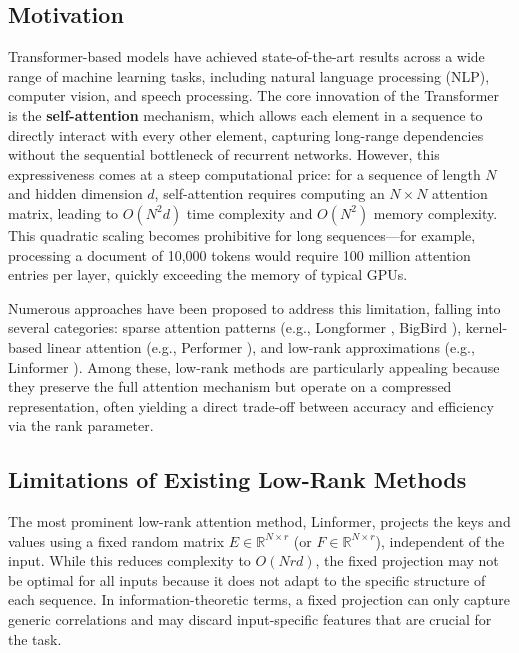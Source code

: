 \documentclass[twocolumn]{article}
\begin{document}
\subsection{Motivation}
Transformer-based models \cite{vaswani2017attention} have achieved state-of-the-art results across a wide range of machine learning tasks, including natural language processing (NLP), computer vision, and speech processing. The core innovation of the Transformer is the \textbf{self-attention} mechanism, which allows each element in a sequence to directly interact with every other element, capturing long-range dependencies without the sequential bottleneck of recurrent networks. However, this expressiveness comes at a steep computational price: for a sequence of length $N$ and hidden dimension $d$, self-attention requires computing an $N \times N$ attention matrix, leading to $O(N^2 d)$ time complexity and $O(N^2)$ memory complexity. This quadratic scaling becomes prohibitive for long sequences—for example, processing a document of 10,000 tokens would require 100 million attention entries per layer, quickly exceeding the memory of typical GPUs.

Numerous approaches have been proposed to address this limitation, falling into several categories: sparse attention patterns (e.g., Longformer \cite{beltagy2020longformer}, BigBird \cite{zaheer2020bigbird}), kernel-based linear attention (e.g., Performer \cite{choromanski2020rethinking}), and low-rank approximations (e.g., Linformer \cite{wang2020linformer}). Among these, low-rank methods are particularly appealing because they preserve the full attention mechanism but operate on a compressed representation, often yielding a direct trade-off between accuracy and efficiency via the rank parameter.

\subsection{Limitations of Existing Low-Rank Methods}
The most prominent low-rank attention method, Linformer, projects the keys and values using a fixed random matrix $E \in \mathbb{R}^{N \times r}$ (or $F \in \mathbb{R}^{N \times r}$), independent of the input. While this reduces complexity to $O(N r d)$, the fixed projection may not be optimal for all inputs because it does not adapt to the specific structure of each sequence. In information-theoretic terms, a fixed projection can only capture generic correlations and may discard input-specific features that are crucial for the task.
\end{document}
